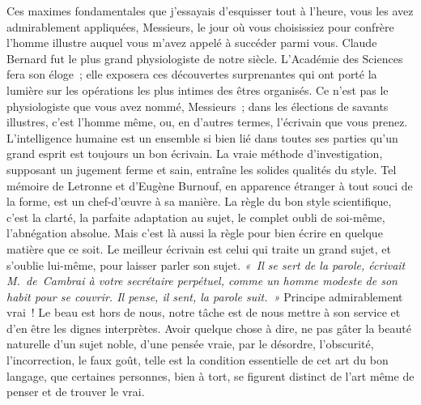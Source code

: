 \documentclass[french,twoside]{book} %
\newcommand\orgName[1]{#1}
\newcommand\persName[1]{#1}
\begin{document}
Ces maximes fondamentales que j’essayais d’esquisser tout à l’heure, vous les avez admirablement appliquées, Messieurs, le jour où vous choisissiez pour confrère l’homme illustre auquel vous m’avez appelé à succéder parmi vous. {\persName Claude Bernard} fut le plus grand physiologiste de notre siècle. L’{\orgName Académie des Sciences} fera son éloge ; elle exposera ces découvertes surprenantes qui ont porté la lumière sur les opérations les plus intimes des êtres organisés. Ce n’est pas le physiologiste que vous avez nommé, Messieurs ; dans les élections de savants illustres, c’est l’homme même, ou, en d’autres termes, l’écrivain que vous prenez. L’intelligence humaine est un ensemble si bien lié dans toutes ses parties qu’un grand esprit est toujours un bon écrivain. La vraie méthode d’investigation, supposant un jugement ferme et sain, entraîne les solides qualités du style. Tel mémoire de {\persName Letronne} et d’{\persName Eugène Burnouf}, en apparence étranger à tout souci de la forme, est un chef-d’œuvre à sa manière. La règle du bon style scientifique, c’est la clarté, la parfaite adaptation au sujet, le complet oubli de soi-même, l’abnégation absolue. Mais c’est là aussi la règle pour bien écrire en quelque matière que ce soit. Le meilleur écrivain est celui qui traite un grand sujet, et s’oublie lui-même, pour laisser parler son sujet. \emph{« Il se sert de la parole, écrivait {\persName M. de Cambrai} à votre secrétaire perpétuel, comme un homme modeste de son habit pour se couvrir. Il pense, il sent, la parole suit. »} Principe admirablement vrai ! Le beau est hors de nous, notre tâche est de nous mettre à son service et d’en être les dignes interprètes. Avoir quelque chose à dire, ne pas gâter la beauté naturelle d’un sujet noble, d’une pensée vraie, par le désordre, l’obscurité, l’incorrection, le faux goût, telle est la condition essentielle de cet art du bon langage, que certaines personnes, bien à tort, se figurent distinct de l’art même de penser et de trouver le vrai.\par
\end{document}
